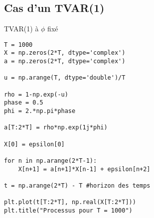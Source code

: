 \documentclass{report}
\begin{document}
\subsection{Cas d'un TVAR(1)}
\renewcommand\listingscaption{Code}
\begin{listing}
\caption{TVAR(1) à $\phi$ fixé}
\begin{verbatim}
T = 1000
X = np.zeros(2*T, dtype='complex')
a = np.zeros(2*T, dtype='complex')

u = np.arange(T, dtype='double')/T

rho = 1-np.exp(-u)
phase = 0.5
phi = 2.*np.pi*phase

a[T:2*T] = rho*np.exp(1j*phi)

X[0] = epsilon[0]
    
for n in np.arange(2*T-1):
    X[n+1] = a[n+1]*X[n-1] + epsilon[n+2]
    
t = np.arange(2*T) - T #horizon des temps

plt.plot(t[T:2*T], np.real(X[T:2*T]))
plt.title("Processus pour T = 1000")
\end{verbatim}
\end{listing}

\renewcommand\listoflistingscaption{Table des codes sources}
\listoflistings


\end{document}
